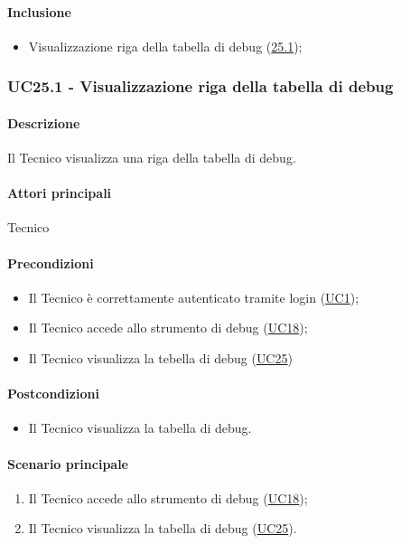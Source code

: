 \paragraph*{Inclusione}
\begin{itemize}
    \item Visualizzazione riga della tabella di debug (\hyperref[UC25point1]{25.1});
\end{itemize}


\subsubsection{UC25.1 - Visualizzazione riga della tabella di debug}\label{UC25point1}
\paragraph*{Descrizione}
Il Tecnico visualizza una riga della tabella di debug. 

\paragraph*{Attori principali}
Tecnico

\paragraph*{Precondizioni}
\begin{itemize}
  \item Il Tecnico è correttamente autenticato tramite login (\hyperref[UC1]{UC1});
  \item Il Tecnico accede allo strumento di debug (\hyperref[UC18]{UC18});
  \item Il Tecnico visualizza la tebella di debug (\hyperref[UC25]{UC25})
\end{itemize}

\paragraph*{Postcondizioni}
\begin{itemize}
  \item Il Tecnico visualizza la tabella di debug.
\end{itemize}

\paragraph*{Scenario principale}
\begin{enumerate}
  \item Il Tecnico accede allo strumento di debug (\hyperref[UC18]{UC18});
  \item Il Tecnico visualizza la tabella di debug (\hyperref[UC25]{UC25}). 
\end{enumerate}

